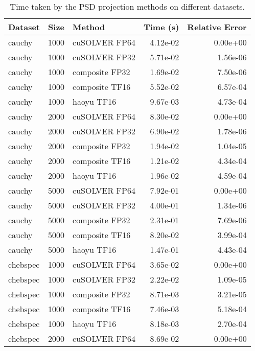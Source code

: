 \begin{table}
\centering
\caption{Time taken by the PSD projection methods on different datasets.}
\label{tab:benchmark_time}
\begin{tabular}{lrlrr}
\toprule
  Dataset &  Size &         Method &  Time (s) &  Relative Error \\
\midrule
   cauchy &  1000 &  cuSOLVER FP64 &  4.12e-02 &        0.00e+00 \\
   cauchy &  1000 &  cuSOLVER FP32 &  5.71e-02 &        1.56e-06 \\
   cauchy &  1000 & composite FP32 &  1.69e-02 &        7.50e-06 \\
   cauchy &  1000 & composite TF16 &  5.52e-02 &        6.57e-04 \\
   cauchy &  1000 &     haoyu TF16 &  9.67e-03 &        4.73e-04 \\
   cauchy &  2000 &  cuSOLVER FP64 &  8.30e-02 &        0.00e+00 \\
   cauchy &  2000 &  cuSOLVER FP32 &  6.90e-02 &        1.78e-06 \\
   cauchy &  2000 & composite FP32 &  1.94e-02 &        1.04e-05 \\
   cauchy &  2000 & composite TF16 &  1.21e-02 &        4.34e-04 \\
   cauchy &  2000 &     haoyu TF16 &  1.96e-02 &        4.59e-04 \\
   cauchy &  5000 &  cuSOLVER FP64 &  7.92e-01 &        0.00e+00 \\
   cauchy &  5000 &  cuSOLVER FP32 &  4.00e-01 &        1.34e-06 \\
   cauchy &  5000 & composite FP32 &  2.31e-01 &        7.69e-06 \\
   cauchy &  5000 & composite TF16 &  8.20e-02 &        3.99e-04 \\
   cauchy &  5000 &     haoyu TF16 &  1.47e-01 &        4.43e-04 \\
 chebspec &  1000 &  cuSOLVER FP64 &  3.65e-02 &        0.00e+00 \\
 chebspec &  1000 &  cuSOLVER FP32 &  2.22e-02 &        1.09e-05 \\
 chebspec &  1000 & composite FP32 &  8.71e-03 &        3.21e-05 \\
 chebspec &  1000 & composite TF16 &  7.46e-03 &        5.18e-04 \\
 chebspec &  1000 &     haoyu TF16 &  8.18e-03 &        2.70e-04 \\
 chebspec &  2000 &  cuSOLVER FP64 &  8.69e-02 &        0.00e+00 \\

\end{tabular}
\end{table}
